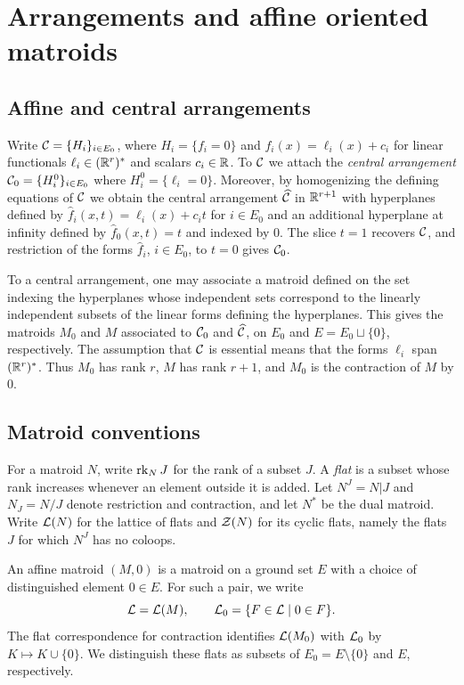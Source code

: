 \section{Arrangements and affine oriented matroids}\label{sec:background}

\subsection{Affine and central arrangements}
Write $\mathcal C=\{H_i\}_{i\in E_0}$, where
$H_i=\{f_i=0\}$ and $f_i(x)=\ell_i(x)+c_i$ for linear functionals $\ell_i \in (\mathbb R^r)^*$ and scalars $c_i \in \mathbb R$. To $\mathcal C$ we attach the \emph{central arrangement} $\mathcal C_0=\{H_i^0\}_{i\in E_0}$ where $H_i^0=\{\ell_i=0\}$. Moreover, by homogenizing the defining equations of $\mathcal C$ we obtain the central arrangement $\widehat{\mathcal C}$ in $\mathbb R^{r+1}$ with hyperplanes defined by $\widehat f_i(x,t)=\ell_i(x)+c_it$ for $i\in E_0$ and an additional hyperplane at infinity defined by $\widehat f_0(x,t)=t$ and indexed by $0$. The slice $t=1$
recovers $\mathcal C$, and restriction of the forms $\widehat f_i$, $i\in E_0$,
to $t=0$ gives $\mathcal C_0$.

To a central arrangement, one may associate a matroid defined on the set indexing the hyperplanes whose independent sets correspond to the linearly independent subsets of the linear forms defining the hyperplanes.
This gives the matroids $M_0$ and $M$ associated to $\mathcal C_0$ and
$\widehat{\mathcal C}$, on $E_0$ and $E=E_0\sqcup\{0\}$, respectively.
The assumption that $\mathcal C$ is essential means that the forms $\ell_i$ span $(\mathbb R^r)^*$.
Thus $M_0$ has rank $r$, $M$ has rank $r+1$, and $M_0$ is the contraction of $M$ by $0$.

\subsection{Matroid conventions}
For a matroid $N$, write $\operatorname{rk}_N J$ for the rank of a subset $J$.
A \emph{flat} is a subset whose rank increases whenever an element
outside it is added. Let $N^J=N|J$ and $N_J=N/J$ denote restriction
and contraction, and let $N^*$ be the dual matroid. Write $\mathcal L(N)$
for the lattice of flats and $\mathcal Z(N)$ for its cyclic flats, namely
the flats $J$ for which $N^J$ has no coloops. 

An affine matroid $(M,0)$ is a matroid on a ground set $E$ with a
choice of distinguished element $0\in E$. For such a pair, we write
\[
 \mathcal L=\mathcal L(M),\qquad \mathcal L_0=\{F\in\mathcal L\mid 0\in F\}.
\]
The flat correspondence for contraction identifies $\mathcal L(M_0)$ with
$\mathcal L_0$ by $K\mapsto K\cup\{0\}$. We distinguish these flats as
subsets of $E_0=E\setminus\{0\}$ and $E$, respectively.


